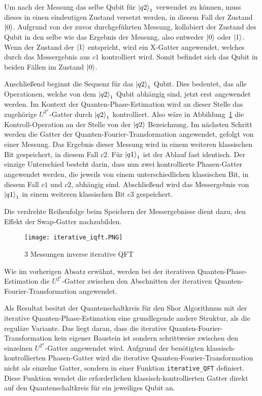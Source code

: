 Um nach der Messung das selbe Qubit für \(\ket{q2}_1\) verwendet zu können, 
muss dieses in einen eindeutigen Zustand versetzt werden, 
in diesem Fall der Zustand \(\ket{0}\).
Aufgrund von der zuvor durchgeführten Messung, 
kollabiert der Zustand des Qubit in den selbe wie das Ergebnis der Messung, 
also entweder \(\ket{0}\) oder \(\ket{1}\).
Wenn der Zustand der \(\ket{1}\) entspricht, 
wird ein X-Gatter angewendet, 
welches durch das Messergebnis aus \(c1\) kontrolliert wird. 
Somit befindet sich das Qubit in beiden Fällen im Zustand \(\ket{0}\).

Anschließend beginnt die Sequenz für das \(\ket{q2}_1\) Qubit.
Dies bedeutet, das alle Operationen, welche von dem \(\ket{q2}_1\) Qubit abhängig sind, 
jetzt erst angewendet werden.
Im Kontext der Quanten-Phase-Estimation wird an dieser Stelle das zugehörige \(U^{2^x}\)-Gatter durch \(\ket{q2}_1\) kontrolliert.
Also wäre in Abbildung~\ref{fig:iterative_iQFT} die Kontroll-Operation an der Stelle von der \(\ket{q2}\) Bezeichnung.
Im nächsten Schritt werden die Gatter der Quanten-Fourier-Transformation angewendet, gefolgt von einer Messung. 
Das Ergebnis dieser Messung wird in einem weiteren klassischen Bit gespeichert, in diesem Fall \(c2\).
Für \(\ket{q1}_1\) ist der Ablauf fast identisch.
Der einzige Unterschied besteht darin, 
dass nun zwei kontrollierte Phasen-Gatter angewendet werden, 
die jeweils von einem unterschiedlichen klassischen Bit, 
in diesem Fall \(c1\) und \(c2\), abhängig sind.
Abschließend wird das Messergebnis von \(\ket{q1}_1\) in einem weiteren klassischen Bit \(c3\) gespeichert.

Die verdrehte Reihenfolge beim Speichern der Messergebnisse dient dazu, 
den Effekt der Swap-Gatter nachzubilden.
\begin{figure} [H]
  \caption{3 Messungen inverse iterative QFT}
  \label{fig:iterative_iQFT}
  \texttt{[image: iterative\_iqft.PNG]}
  \centering
  \end{figure}
  
Wie im vorherigen Absatz erwähnt, 
werden bei der iterativen Quanten-Phase-Estimation die \(U^{2^x}\)-Gatter zwischen den Abschnitten 
der iterativen Quanten-Fourier-Transformation angewendet. 

Als Resultat besitzt der Quantenschaltkreis für den Shor Algorithmus mit der iterative Quanten-Phase-Estimation eine grundlegende andere Struktur, 
als die reguläre Variante.
Das liegt daran, dass die iterative Quanten-Fourier-Transformation kein eigener Baustein ist sondern schrittweise zwischen 
den einzelnen \(U^{2^x}\)-Gatter angewendet wird.
Aufgrund der benötigten klassisch-kontrollierten Phasen-Gatter wird die iterative Quanten-Fourier-Transformation nicht als einzelne Gatter, 
sondern in einer Funktion \texttt{iterative\_QFT} definiert.
Diese Funktion wendet die erforderlichen klassisch-kontrollierten Gatter direkt auf den Quantenschaltkreis für ein jeweiliges Qubit an.

